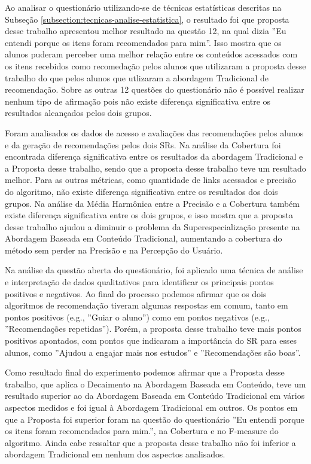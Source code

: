 Ao analisar o questionário utilizando-se de técnicas estatísticas descritas na Subseção \ref{subsection:tecnicas-analise-estatistica},
o resultado foi que proposta desse trabalho apresentou melhor resultado na questão 12, na qual dizia
''Eu entendi porque os itens foram recomendados para mim''. Isso mostra que os alunos puderam perceber uma melhor relação
entre os conteúdos acessados com os itens recebidos como recomedação pelos alunos que utilizaram a proposta desse trabalho
do que pelos alunos que utlizaram a abordagem Tradicional de recomendação. Sobre as outras 12 questões do questionário
não é possível realizar nenhum tipo de afirmação pois não existe diferença significativa entre os resultados
alcançados pelos dois grupos.

Foram analisados os dados de acesso e avaliações das recomendações pelos alunos e da geração de recomendações pelos dois
SRs. Na análise da Cobertura foi encontrada diferença significativa entre os resultados
da abordagem Tradicional e a Proposta desse trabalho, sendo que a proposta desse trabalho teve um resultado melhor. Para as
outras métricas, como quantidade de links acessados e precisão do algoritmo, não existe diferença significativa entre os resultados
dos dois grupos. Na análise da Média Harmônica entre a Precisão e a Cobertura também existe diferença significativa
entre os dois grupos, e isso mostra que a proposta desse trabalho ajudou a diminuir o problema da Superespecialização presente na Abordagem Baseada em Conteúdo Tradicional,
aumentando a cobertura do método sem perder na Precisão e na Percepção do Usuário.

Na análise da questão aberta do questionário, foi aplicado uma técnica de análise e interpretação de dados qualitativos
para identificar os principais pontos positivos e negativos. Ao final do processo podemos afirmar que os dois algoritmos
de recomendação tiveram algumas respostas em comum, tanto em pontos positivos (e.g., ''Guiar o aluno'') como em pontos
negativos (e.g., ''Recomendações repetidas''). Porém, a proposta desse trabalho teve mais pontos positivos apontados,
com pontos que indicaram a importância do SR para esses alunos, como ''Ajudou a engajar mais nos estudos'' e ''Recomendações são boas''.

Como resultado final do experimento podemos afirmar que a Proposta desse trabalho, que aplica o Decaimento na
Abordagem Baseada em Conteúdo, teve um resultado superior ao da Abordagem Baseada em Conteúdo Tradicional em vários aspectos
medidos e foi igual à Abordagem Tradicional em outros. Os pontos em que a Proposta foi superior foram na questão do questionário
''Eu entendi porque os itens foram recomendados para mim.'', na Cobertura e no F-measure do algoritmo. Ainda cabe ressaltar que a proposta
desse trabalho não foi inferior a abordagem Tradicional em nenhum dos aspectos analisados.
